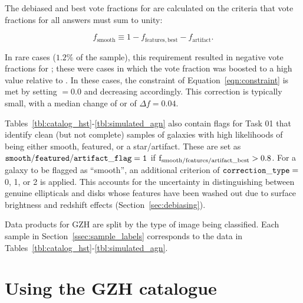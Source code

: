 \documentclass[a4paper,fleqn,usenatbib]{mnras}
\begin{document}
The debiased and best vote fractions for \fsmooth{} are calculated on the
criteria that vote fractions for all answers must sum to unity:

\begin{equation}
f_\mathrm{smooth} \equiv 1 - f_\mathrm{features,best} - f_\mathrm{artifact}.
\label{eqn:constraint}
\end{equation}

\noindent In rare cases ($1.2\%$ of the \main{} sample), this requirement resulted in
negative vote fractions for \fsmooth; these were cases in which the
\ffeatures{} vote fraction was boosted to a high value relative to \fartifact.
In these cases, the constraint of Equation~\ref{eqn:constraint} is met by
setting \fsmooth$=0.0$ and decreasing \fbest{} accordingly. This correction is
typically small, with a median change of
\ffeatures{} or \fsmooth{} of $\Delta f = 0.04$.

Tables~\ref{tbl:catalog_hst}-\ref{tbl:simulated_agn} also contain flags for
Task 01 that identify clean (but not complete) samples of galaxies with high
likelihoods of being either smooth, featured, or a star/artifact.  These are
set as $\tt smooth/featured/artifact\_flag=1$ if $\rm
f_{smooth/features/artifact\_best}>0.8$. For a galaxy to be flagged as
``smooth'', an additional criterion of $\tt correction\_type =~$0, 1, or 2 is
applied. This accounts for the uncertainty in distinguishing between genuine
ellipticals and disks whose features have been washed out due to surface
brightness and redshift effects (Section~\ref{sec:debiasing}).

Data products for GZH are split by the type of image being classified. Each
sample in Section~\ref{ssec:sample_labels} corresponds to the data in
Tables~\ref{tbl:catalog_hst}-\ref{tbl:simulated_agn}.

\clearpage




\clearpage



\clearpage

\section{Using the GZH catalogue}\label{sec:cookbook}
\end{document}
